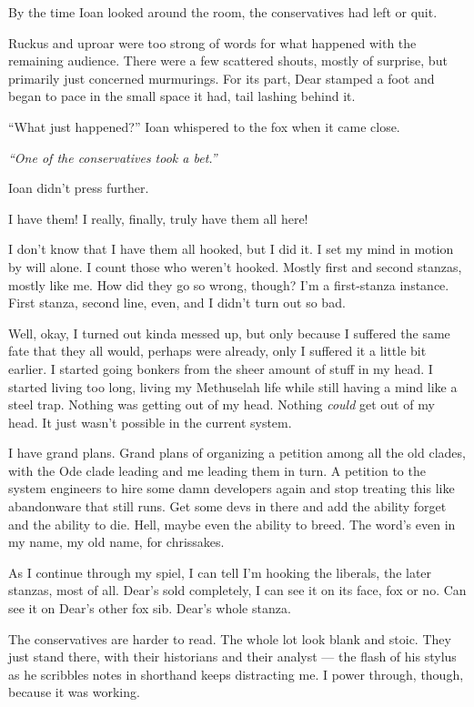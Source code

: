By the time Ioan looked around the room, the conservatives had left or quit.

Ruckus and uproar were too strong of words for what happened with the remaining audience. There were a few scattered shouts, mostly of surprise, but primarily just concerned murmurings. For its part, Dear stamped a foot and began to pace in the small space it had, tail lashing behind it.

``What just happened?'' Ioan whispered to the fox when it came close.

\emph{``One of the conservatives took a bet.''}

Ioan didn't press further.

\secdiv{}

\noindent I have them! I really, finally, truly have them all here!

I don't know that I have them all hooked, but I did it. I set my mind in motion by will alone. I count those who weren't hooked. Mostly first and second stanzas, mostly like me. How did they go so wrong, though? I'm a first-stanza instance. First stanza, second line, even, and I didn't turn out so bad.

Well, okay, I turned out kinda messed up, but only because I suffered the same fate that they all would, perhaps were already, only I suffered it a little bit earlier. I started going bonkers from the sheer amount of stuff in my head. I started living too long, living my Methuselah life while still having a mind like a steel trap. Nothing was getting out of my head. Nothing \emph{could} get out of my head. It just wasn't possible in the current system.

I have grand plans. Grand plans of organizing a petition among all the old clades, with the Ode clade leading and me leading them in turn. A petition to the system engineers to hire some damn developers again and stop treating this like abandonware that still runs. Get some devs in there and add the ability forget and the ability to die. Hell, maybe even the ability to breed. The word's even in my name, my old name, for chrissakes.

As I continue through my spiel, I can tell I'm hooking the liberals, the later stanzas, most of all. Dear's sold completely, I can see it on its face, fox or no. Can see it on Dear's other fox sib. Dear's whole stanza.

The conservatives are harder to read. The whole lot look blank and stoic. They just stand there, with their historians and their analyst --- the flash of his stylus as he scribbles notes in shorthand keeps distracting me. I power through, though, because it was working.

